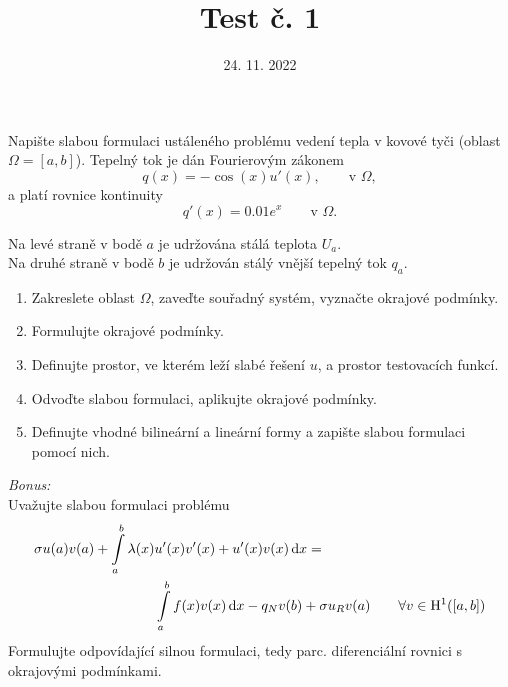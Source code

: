 \documentclass{article}
\def\d{{\rm{d}}}
\begin{document}
\title{Test č. 1}
\date{24. 11. 2022}
\author{}
\maketitle


\noindent

Napište slabou formulaci ustáleného problému vedení tepla v kovové tyči (oblast $\Omega=[a,b]$).
Tepelný tok je dán Fourierovým zákonem
\[
    q(x) = -\cos(x)u'(x), \qquad \textrm{v }\Omega,
\]
a platí rovnice kontinuity
\[
    q'(x) = 0.01e^x \qquad \textrm{v }\Omega.
\]

\noindent
Na levé straně v bodě $a$ je udržována stálá teplota $U_a$.\\
Na druhé straně v bodě $b$ je udržován stálý vnější tepelný tok $q_a$.

\begin{enumerate}
\item Zakreslete oblast $\Omega$, zaveďte souřadný systém, vyznačte okrajové podmínky.
\item Formulujte okrajové podmínky.
\item Definujte prostor, ve kterém leží slabé řešení $u$, a prostor testovacích funkcí.
\item Odvoďte slabou formulaci, aplikujte okrajové podmínky.
\item Definujte vhodné bilineární a lineární formy a zapište slabou formulaci pomocí nich.
\end{enumerate}

\vspace{2cm}
\emph{Bonus:}\\
Uvažujte slabou formulaci problému
\begin{align*}
    \sigma u(a)v(a) + \int\limits_{a}^{b} \lambda(x) & u'(x)v'(x) + u'(x)v(x) \,\d x = \\
        &\int\limits_{a}^{b} f(x)v(x) \,\d x - q_Nv(b) + \sigma u_R v(a) \qquad \forall v\in \mathrm{H}^1([a,b])
\end{align*}
Formulujte odpovídající silnou formulaci, tedy parc. diferenciální rovnici s okrajovými podmínkami.
\end{document}

